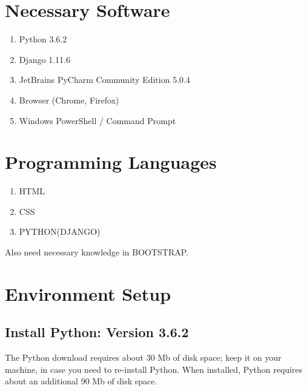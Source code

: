\documentclass[11pt]{article}
\begin{document}
\begin{multicols}{2}
\section{Necessary Software}
\begin{enumerate}
\item Python 3.6.2
\item Django 1.11.6
\item JetBrains PyCharm Community Edition 5.0.4
\item Browser (Chrome, Firefox)
\item Windows PowerShell / Command Prompt
\end{enumerate}
\section{Programming Languages}
\begin{enumerate}
\item HTML
\item CSS
\item PYTHON(DJANGO)
\end{enumerate}
Also need necessary knowledge in BOOTSTRAP.
\section{Environment Setup}
\subsection{Install Python: Version 3.6.2}
The Python download requires about 30 Mb of disk space; keep it on your machine, in case you need to re-install Python. When installed, Python requires about an additional 90 Mb of disk space.

\end{multicols}
\end{document}
